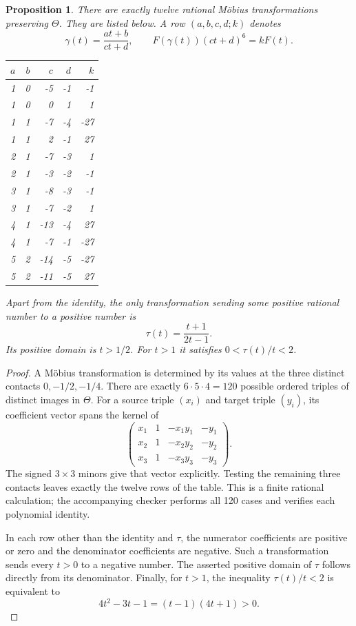 \documentclass[11pt,a4paper]{article}
\newtheorem{proposition}[theorem]{Proposition}
\begin{document}
\begin{proposition}\label{prop:automorphisms}
There are exactly twelve rational M\"obius transformations preserving
$\Theta$. They are listed below. A row $(a,b,c,d;k)$ denotes
\[
 \gamma(t)=\frac{at+b}{ct+d},\qquad
                 F(\gamma(t))(ct+d)^6=kF(t).
\]
\begin{center}
\begin{tabular}{rrrrr}
\toprule
$a$&$b$&$c$&$d$&$k$\\
\midrule
1&0&-5&-1&-1\\
1&0&0&1&1\\
1&1&-7&-4&-27\\
1&1&2&-1&27\\
2&1&-7&-3&1\\
2&1&-3&-2&-1\\
3&1&-8&-3&-1\\
3&1&-7&-2&1\\
4&1&-13&-4&27\\
4&1&-7&-1&-27\\
5&2&-14&-5&-27\\
5&2&-11&-5&27\\
\bottomrule
\end{tabular}
\end{center}
Apart from the identity, the only transformation sending some positive
rational number to a positive number is
\[
                           \tau(t)=\frac{t+1}{2t-1}.
\]
Its positive domain is $t>1/2$. For $t>1$ it satisfies
$0<\tau(t)/t<2$.
\end{proposition}
\begin{proof}
A M\"obius transformation is determined by its values at the three
distinct contacts $0,-1/2,-1/4$. There are exactly
$6\cdot5\cdot4=120$ possible ordered triples of distinct images
in $\Theta$. For a source triple $(x_i)$ and target triple $(y_i)$,
its coefficient vector spans the kernel of
\[
 \begin{pmatrix}
 x_1&1&-x_1y_1&-y_1\\
 x_2&1&-x_2y_2&-y_2\\
 x_3&1&-x_3y_3&-y_3
 \end{pmatrix}.
\]
The signed $3\times3$ minors give that vector explicitly. Testing
the remaining three contacts leaves exactly the twelve rows of the
table. This is a finite rational calculation; the accompanying checker
performs all 120 cases and verifies each polynomial identity.

In each row other than the identity and $\tau$, the numerator
coefficients are positive or zero and the denominator coefficients
are negative. Such a transformation sends every $t>0$ to a negative
number. The asserted positive domain of $\tau$ follows directly
from its denominator. Finally, for $t>1$, the inequality
$\tau(t)/t<2$ is equivalent to
\[
                     4t^2-3t-1=(t-1)(4t+1)>0.
\]
\end{proof}
\end{document}
